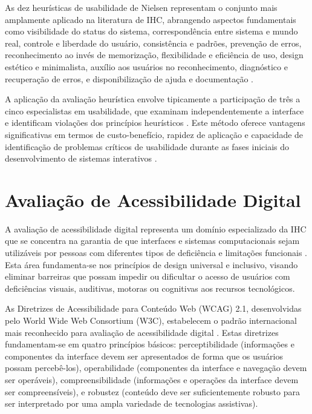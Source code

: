 As dez heurísticas de usabilidade de Nielsen representam o conjunto mais amplamente aplicado na literatura de IHC, abrangendo aspectos fundamentais como visibilidade do status do sistema, correspondência entre sistema e mundo real, controle e liberdade do usuário, consistência e padrões, prevenção de erros, reconhecimento ao invés de memorização, flexibilidade e eficiência de uso, design estético e minimalista, auxílio aos usuários no reconhecimento, diagnóstico e recuperação de erros, e disponibilização de ajuda e documentação \cite{nielsen1995ten}.

A aplicação da avaliação heurística envolve tipicamente a participação de três a cinco especialistas em usabilidade, que examinam independentemente a interface e identificam violações dos princípios heurísticos \cite{nielsen1994finding}. Este método oferece vantagens significativas em termos de custo-benefício, rapidez de aplicação e capacidade de identificação de problemas críticos de usabilidade durante as fases iniciais do desenvolvimento de sistemas interativos \cite{zhang2003comparison}.

\section{Avaliação de Acessibilidade Digital}
A avaliação de acessibilidade digital representa um domínio especializado da IHC que se concentra na garantia de que interfaces e sistemas computacionais sejam utilizáveis por pessoas com diferentes tipos de deficiência e limitações funcionais \cite{petrie2007accessibility}. Esta área fundamenta-se nos princípios de design universal e inclusivo, visando eliminar barreiras que possam impedir ou dificultar o acesso de usuários com deficiências visuais, auditivas, motoras ou cognitivas aos recursos tecnológicos.

As Diretrizes de Acessibilidade para Conteúdo Web (WCAG) 2.1, desenvolvidas pelo World Wide Web Consortium (W3C), estabelecem o padrão internacional mais reconhecido para avaliação de acessibilidade digital \cite{w3c2018wcag}. Estas diretrizes fundamentam-se em quatro princípios básicos: perceptibilidade (informações e componentes da interface devem ser apresentados de forma que os usuários possam percebê-los), operabilidade (componentes da interface e navegação devem ser operáveis), compreensibilidade (informações e operações da interface devem ser compreensíveis), e robustez (conteúdo deve ser suficientemente robusto para ser interpretado por uma ampla variedade de tecnologias assistivas).

